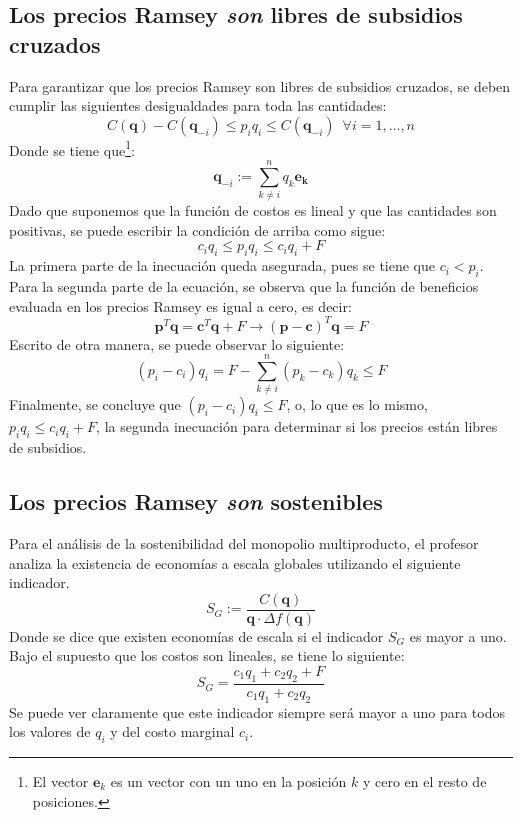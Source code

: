 \documentclass{article}
\begin{document}
\subsection*{Los precios Ramsey \textit{son} libres de subsidios cruzados}
Para garantizar que los precios Ramsey son libres de subsidios cruzados, se deben cumplir las siguientes desigualdades para toda las cantidades:
\begin{equation*}
    C(\mathbf{q}) - C(\mathbf{q}_{-i}) \leq p_iq_i \leq C(\mathbf{q}_{-i}) \ \; \forall i=1,\ldots,n
\end{equation*}
Donde se tiene que\footnote{El vector $\mathbf{e}_k$ es un vector con un uno en la posición $k$ y cero en el resto de posiciones.}:
\begin{equation*}
    \mathbf{q}_{-i} := \sum_{k\neq i}^n q_k \mathbf{e_k}
\end{equation*}
\newpage
Dado que suponemos que la función de costos es lineal y que las cantidades son positivas, se puede escribir la condición de arriba como sigue:
\begin{equation*}
    c_iq_i \leq p_iq_i \leq c_iq_i + F
\end{equation*}
La primera parte de la inecuación queda asegurada, pues se tiene que $c_i < p_i$. Para la segunda parte de la ecuación, se observa que la función de beneficios evaluada en los precios Ramsey es igual a cero, es decir:
\begin{equation*}
    \mathbf{p}^T\mathbf{q} = \mathbf{c}^T\mathbf{q} + F \to \left( \mathbf{p} - \mathbf{c}\right)^T\mathbf{q} = F
\end{equation*}
Escrito de otra manera, se puede observar lo siguiente:
\begin{equation*}
    \left(p_i-c_i\right)q_i = F - \sum_{k\neq i}^{n} \left(p_k-c_k\right)q_k \leq F
\end{equation*}
Finalmente, se concluye que $\left(p_i-c_i\right)q_i\leq F$, o, lo que es lo mismo, $p_iq_i \leq c_iq_i + F$, la segunda inecuación para determinar si los precios están libres de subsidios.
\subsection*{Los precios Ramsey \textit{son} sostenibles}
Para el análisis de la sostenibilidad del monopolio multiproducto, el profesor analiza la existencia de economías a escala globales utilizando el siguiente indicador. 
\begin{equation*}
    S_G := \frac{C(\mathbf{q})}{\mathbf{q}\cdot \Delta f(\mathbf{q})}
\end{equation*}
Donde se dice que existen economías de escala si el indicador $S_G$ es mayor a uno. Bajo el supuesto que los costos son lineales, se tiene lo siguiente:
\begin{equation*}
    S_G = \frac{c_1q_1 + c_2q_2 + F}{c_1q_1 + c_2q_2}
\end{equation*}
Se puede ver claramente que este indicador siempre será mayor a uno para todos los valores de $q_i$ y del costo marginal $c_i$. 
\end{document}
